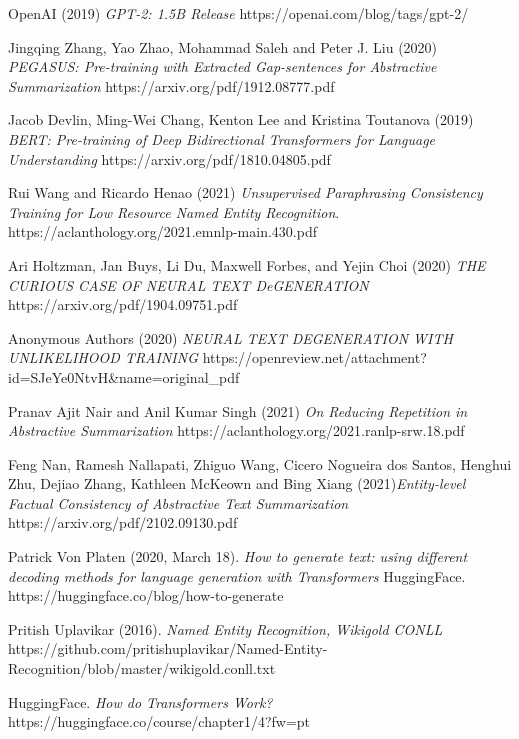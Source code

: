 \documentclass[12pt]{report}
\begin{document}
\begin{thebibliography}{9}
        OpenAI (2019) \emph{GPT-2: 1.5B Release}
        https://openai.com/blog/tags/gpt-2/
        
        
        
        Jingqing Zhang, Yao Zhao, Mohammad Saleh and Peter J. Liu (2020) \emph{PEGASUS: Pre-training with Extracted Gap-sentences for Abstractive Summarization}
        https://arxiv.org/pdf/1912.08777.pdf
        
    
        Jacob Devlin, Ming-Wei Chang, Kenton Lee and Kristina Toutanova (2019) \emph{BERT: Pre-training of Deep Bidirectional Transformers for Language Understanding}
        https://arxiv.org/pdf/1810.04805.pdf
        
        
        
        Rui Wang and Ricardo Henao (2021) \emph{Unsupervised Paraphrasing Consistency Training for Low Resource
Named Entity Recognition}.
        https://aclanthology.org/2021.emnlp-main.430.pdf
    
        Ari Holtzman, Jan Buys, Li Du, Maxwell Forbes, and Yejin Choi (2020) \emph{THE CURIOUS CASE OF NEURAL TEXT DeGENERATION}
        https://arxiv.org/pdf/1904.09751.pdf
    
        Anonymous Authors (2020) \emph{NEURAL TEXT DEGENERATION WITH UNLIKELIHOOD TRAINING}
    https://openreview.net/attachment?id=SJeYe0NtvH\&name=original\_pdf
    
        Pranav Ajit Nair and Anil Kumar Singh (2021) \emph{On Reducing Repetition in Abstractive Summarization}
        https://aclanthology.org/2021.ranlp-srw.18.pdf
    
        Feng Nan, Ramesh Nallapati, Zhiguo Wang, Cicero Nogueira dos Santos, Henghui Zhu, Dejiao Zhang, Kathleen McKeown and Bing Xiang (2021)\emph{Entity-level Factual Consistency of Abstractive Text Summarization}
        https://arxiv.org/pdf/2102.09130.pdf
    
        Patrick Von Platen (2020, March 18). \emph{How to generate text: using different decoding methods for language generation with Transformers} HuggingFace.
        https://huggingface.co/blog/how-to-generate
    
        Pritish Uplavikar (2016). \emph{Named Entity Recognition, Wikigold CONLL}
        https://github.com/pritishuplavikar/Named-Entity-Recognition/blob/master/wikigold.conll.txt
    
        HuggingFace. \emph{How do Transformers Work?}
        https://huggingface.co/course/chapter1/4?fw=pt
    
\end{thebibliography}
\end{document}
